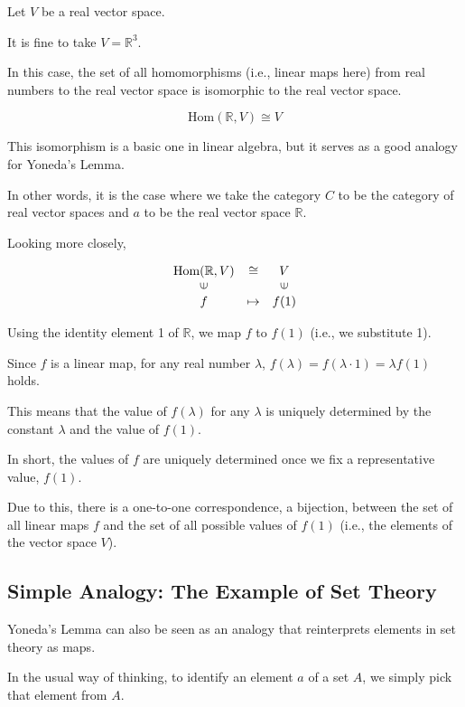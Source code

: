 \documentclass[uplatex,a4j,12pt,dvipdfmx]{jsarticle}
\begin{document}
Let $V$ be a real vector space.

It is fine to take $V=\mathbb{R}^{3}$.

In this case, the set of all homomorphisms (i.e., linear maps here) from real numbers to the real vector space is isomorphic to the real vector space.

\[
	\text{Hom}(\mathbb{R},V) \cong V
\]

This isomorphism is a basic one in linear algebra, but it serves as a good analogy for Yoneda's Lemma.

In other words, it is the case where we take the category $C$ to be the category of real vector spaces and $a$ to be the real vector space $\mathbb{R}$.


Looking more closely,

\[
	\begin{array}{ccc}
		\text{Hom}(\mathbb{R},V) & \cong   & V                       \\
		\rotatebox{90}{${\in}$}  &         & \rotatebox{90}{${\in}$} \\
		f                        & \mapsto & f(1)
	\end{array}
\]

Using the identity element 1 of $\mathbb{R}$, we map $f$ to $f(1)$ (i.e., we substitute 1).

Since $f$ is a linear map, for any real number $\lambda$, $f(\lambda) = f(\lambda \cdot 1) = \lambda f(1)$ holds.

This means that the value of $f(\lambda)$ for any $\lambda$ is uniquely determined by the constant $\lambda$ and the value of $f(1)$.

In short, the values of $f$ are uniquely determined once we fix a representative value, $f(1)$.

Due to this, there is a one-to-one correspondence, a bijection, between the set of all linear maps $f$ and the set of all possible values of $f(1)$ (i.e., the elements of the vector space $V$).





\subsection{Simple Analogy: The Example of Set Theory}

Yoneda's Lemma can also be seen as an analogy that reinterprets elements in set theory as maps.

In the usual way of thinking, to identify an element $a$ of a set $A$, we simply pick that element from $A$.
\end{document}
